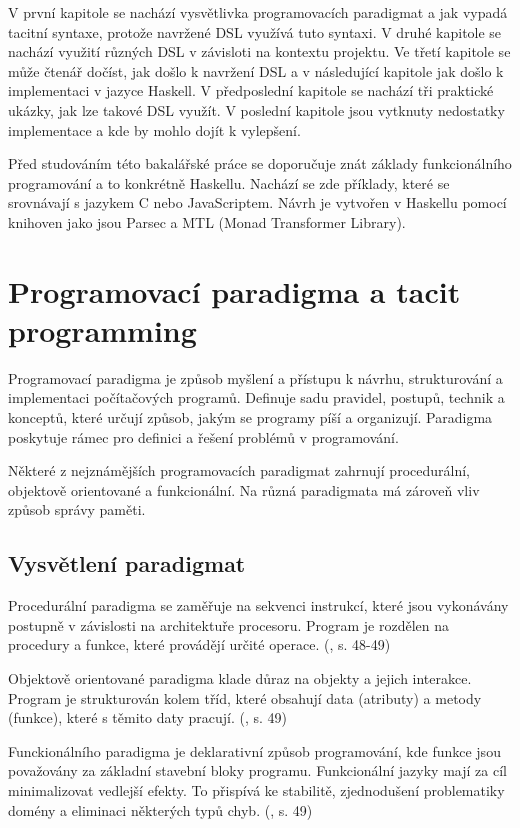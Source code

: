 \documentclass[male,czech]{kithesis}
\begin{document}
V první kapitole se nachází vysvětlivka programovacích paradigmat a 
jak vypadá tacitní syntaxe, 
protože navržené DSL využívá tuto syntaxi. 
V druhé kapitole se nachází využití různých DSL v závisloti na kontextu projektu.
Ve třetí kapitole se může čtenář dočíst, 
jak došlo k navržení DSL a 
v následující kapitole jak došlo k implementaci v jazyce Haskell.
V předposlední kapitole se nachází tři praktické ukázky, 
jak lze takové DSL využít.
V poslední kapitole jsou vytknuty nedostatky implementace a
kde by mohlo dojít k vylepšení. 

Před studováním této bakalářské práce se doporučuje znát základy funkcionálního programování a
to konkrétně Haskellu.
Nachází se zde příklady,
které se srovnávají s jazykem C nebo JavaScriptem.
Návrh je vytvořen v Haskellu pomocí knihoven jako
jsou Parsec a MTL (Monad Transformer Library).

\chapter{Programovací paradigma a tacit programming}

Programovací paradigma je způsob myšlení a přístupu k návrhu, 
strukturování a 
implementaci počítačových programů. 
Definuje sadu pravidel, postupů, technik a konceptů, 
které určují způsob,
jakým se programy píší a organizují. 
Paradigma poskytuje rámec pro definici a 
řešení problémů v programování.

Některé z nejznámějších programovacích paradigmat zahrnují 
procedurální, objektově orientované a funkcionální.
Na různá paradigmata má zároveň vliv způsob 
správy paměti.

\section{Vysvětlení paradigmat}

Procedurální paradigma se zaměřuje na sekvenci instrukcí, 
které jsou vykonávány postupně
v závislosti na architektuře procesoru.
Program je rozdělen na procedury a funkce, 
které provádějí určité operace. (\cite{Martin2018}, s. 48-49)

Objektově orientované paradigma klade důraz na objekty a
jejich interakce. 
Program je strukturován kolem tříd, 
které obsahují data (atributy) a 
metody (funkce), 
které s těmito daty pracují. (\cite{Martin2018}, s. 49)

Funckionálního paradigma je deklarativní způsob programování, 
kde funkce jsou považovány za základní stavební bloky programu. 
Funkcionální jazyky mají za cíl minimalizovat vedlejší efekty.
To přispívá ke stabilitě, zjednodušení problematiky domény a 
eliminaci některých typů chyb. (\cite{Martin2018}, s. 49)
\end{document}
